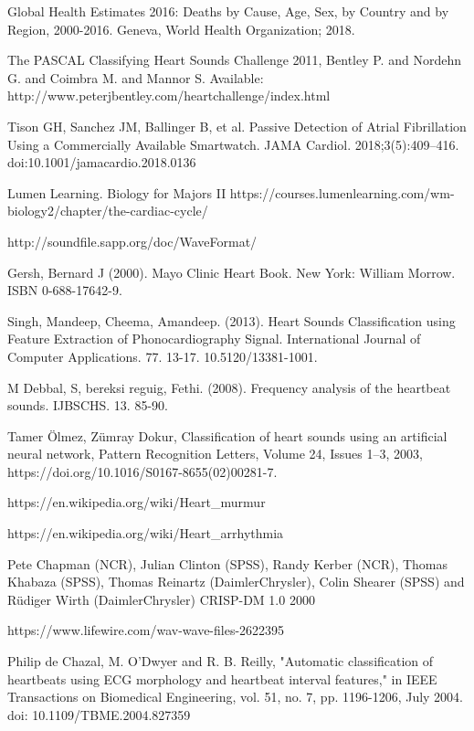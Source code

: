 \documentclass[11pt, a4papper]{report}
\theoremstyle{plain}
\theoremstyle{definition}
\theoremstyle{definition}
\theoremstyle{proposition}
\begin{document}

\begin{thebibliography}{1}
 Global Health Estimates 2016: Deaths by Cause, Age, Sex, by Country and by Region, 2000-2016. Geneva, World Health Organization; 2018.

 The PASCAL Classifying Heart Sounds Challenge 2011, Bentley P. and Nordehn G. and Coimbra M. and Mannor S. Available: http://www.peterjbentley.com/heartchallenge/index.html

 Tison GH, Sanchez JM, Ballinger B, et al. Passive Detection of Atrial Fibrillation Using a Commercially Available Smartwatch. JAMA Cardiol. 2018;3(5):409–416. doi:10.1001/jamacardio.2018.0136

 Lumen Learning. Biology for Majors II https://courses.lumenlearning.com/wm-biology2/chapter/the-cardiac-cycle/

 http://soundfile.sapp.org/doc/WaveFormat/

 Gersh, Bernard J (2000). Mayo Clinic Heart Book. New York: William Morrow. ISBN 0-688-17642-9.

 Singh, Mandeep, Cheema, Amandeep. (2013). Heart Sounds Classification using Feature Extraction of Phonocardiography Signal. International Journal of Computer Applications. 77. 13-17. 10.5120/13381-1001. 

 M Debbal, S, bereksi reguig, Fethi. (2008). Frequency analysis of the heartbeat sounds. IJBSCHS. 13. 85-90. 

 Tamer Ölmez, Zümray Dokur, Classification of heart sounds using an artificial neural network, Pattern Recognition Letters, Volume 24, Issues 1–3, 2003, https://doi.org/10.1016/S0167-8655(02)00281-7.

 https://en.wikipedia.org/wiki/Heart\_murmur

 https://en.wikipedia.org/wiki/Heart\_arrhythmia
 
 Pete Chapman (NCR), Julian Clinton (SPSS), Randy Kerber (NCR), Thomas Khabaza (SPSS), Thomas Reinartz (DaimlerChrysler), Colin Shearer (SPSS) and Rüdiger Wirth (DaimlerChrysler) CRISP-DM 1.0 2000
 
 https://www.lifewire.com/wav-wave-files-2622395
 
 Philip de Chazal, M. O'Dwyer and R. B. Reilly, "Automatic classification of heartbeats using ECG morphology and heartbeat interval features," in IEEE Transactions on Biomedical Engineering, vol. 51, no. 7, pp. 1196-1206, July 2004. doi: 10.1109/TBME.2004.827359


\end{thebibliography}
\end{document}
